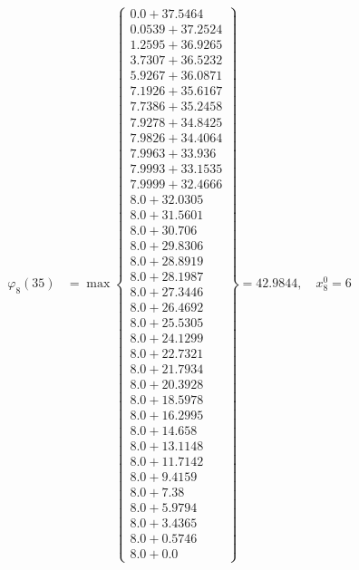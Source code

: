 \documentclass{article}
\begin{document}
\begin{align*}
\varphi_{8}(35) &= \max \left\{ \begin{array}{c}
0.0 + 37.5464 \\
 0.0539 + 37.2524 \\
 1.2595 + 36.9265 \\
 3.7307 + 36.5232 \\
 5.9267 + 36.0871 \\
 7.1926 + 35.6167 \\
 7.7386 + 35.2458 \\
 7.9278 + 34.8425 \\
 7.9826 + 34.4064 \\
 7.9963 + 33.936 \\
 7.9993 + 33.1535 \\
 7.9999 + 32.4666 \\
 8.0 + 32.0305 \\
 8.0 + 31.5601 \\
 8.0 + 30.706 \\
 8.0 + 29.8306 \\
 8.0 + 28.8919 \\
 8.0 + 28.1987 \\
 8.0 + 27.3446 \\
 8.0 + 26.4692 \\
 8.0 + 25.5305 \\
 8.0 + 24.1299 \\
 8.0 + 22.7321 \\
 8.0 + 21.7934 \\
 8.0 + 20.3928 \\
 8.0 + 18.5978 \\
 8.0 + 16.2995 \\
 8.0 + 14.658 \\
 8.0 + 13.1148 \\
 8.0 + 11.7142 \\
 8.0 + 9.4159 \\
 8.0 + 7.38 \\
 8.0 + 5.9794 \\
 8.0 + 3.4365 \\
 8.0 + 0.5746 \\
 8.0 + 0.0
\end{array} \right\}=42.9844, \quad x_{8}^0=6\\
  

\end{align*}
\end{document}
